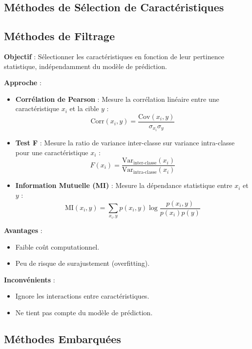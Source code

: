 \documentclass[a4paper,portrait]{article}
\begin{document}
\begin{multicols}{2}
\section{Méthodes de Sélection de Caractéristiques}

\subsection{Méthodes de Filtrage}

\textbf{Objectif} : Sélectionner les caractéristiques en fonction de leur pertinence statistique, indépendamment du modèle de prédiction.

\textbf{Approche} :
\begin{itemize}
    \item \textbf{Corrélation de Pearson} : Mesure la corrélation linéaire entre une caractéristique \( x_i \) et la cible \( y \) :
    \[
    \text{Corr}(x_i, y) = \frac{\text{Cov}(x_i, y)}{\sigma_{x_i} \sigma_y}
    \]
    \item \textbf{Test F} : Mesure la ratio de variance inter-classe sur variance intra-classe pour une caractéristique \( x_i \) :
    \[
    F(x_i) = \frac{\text{Var}_{\text{inter-classe}}(x_i)}{\text{Var}_{\text{intra-classe}}(x_i)}
    \]
    \item \textbf{Information Mutuelle (MI)} : Mesure la dépendance statistique entre \( x_i \) et \( y \) :
    \[
    \text{MI}(x_i, y) = \sum_{x_i, y} p(x_i, y) \log \frac{p(x_i, y)}{p(x_i) p(y)}
    \]
\end{itemize}

\textbf{Avantages} :
\begin{itemize}
    \item Faible coût computationnel.
    \item Peu de risque de surajustement (overfitting).
\end{itemize}

\textbf{Inconvénients} :
\begin{itemize}
    \item Ignore les interactions entre caractéristiques.
    \item Ne tient pas compte du modèle de prédiction.
\end{itemize}



\subsection{Méthodes Embarquées}


\end{multicols}
\end{document}
